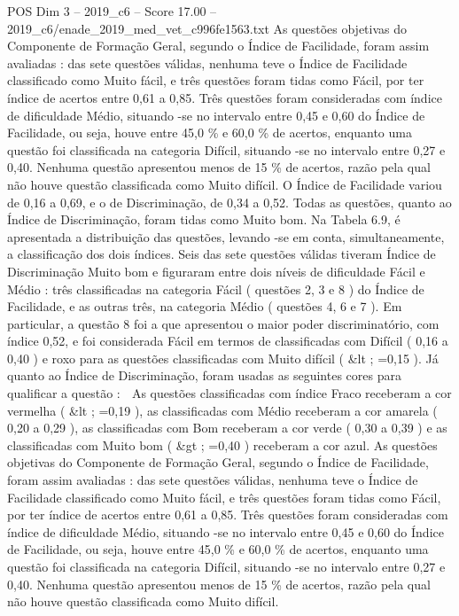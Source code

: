 \begin{textsample}{POS Dim 3 – 2019\_c6 – Score 17.00 – 2019\_c6/enade\_2019\_med\_vet\_c996fe1563.txt}
As questões objetivas do Componente de Formação Geral, segundo o Índice de Facilidade, foram assim avaliadas : das sete questões válidas, nenhuma teve o Índice de Facilidade classificado como Muito fácil, e três questões foram tidas como Fácil, por ter índice de acertos entre 0,61 a 0,85.
Três questões foram consideradas com índice de dificuldade Médio, situando -se no intervalo entre 0,45 e 0,60 do Índice de Facilidade, ou seja, houve entre 45,0 \% e 60,0 \% de acertos, enquanto uma questão foi classificada na categoria Difícil, situando -se no intervalo entre 0,27 e 0,40.
Nenhuma questão apresentou menos de 15 \% de acertos, razão pela qual não houve questão classificada como Muito difícil.
O Índice de Facilidade variou de 0,16 a 0,69, e o de Discriminação, de 0,34 a 0,52.
Todas as questões, quanto ao Índice de Discriminação, foram tidas como Muito bom.
Na Tabela 6.9, é apresentada a distribuição das questões, levando -se em conta, simultaneamente, a classificação dos dois índices.
Seis das sete questões válidas tiveram Índice de Discriminação Muito bom e figuraram entre dois níveis de dificuldade Fácil e Médio : três classificadas na categoria Fácil ( questões 2, 3 e 8 ) do Índice de Facilidade, e as outras três, na categoria Médio ( questões 4, 6 e 7 ).
Em particular, a questão 8 foi a que apresentou o maior poder discriminatório, com índice 0,52, e foi considerada Fácil em termos de classificadas com Difícil ( 0,16 a 0,40 ) e roxo para as questões classificadas com Muito difícil ( \&lt ; =0,15 ).
Já quanto ao Índice de Discriminação, foram usadas as seguintes cores para qualificar a questão :  As questões classificadas com índice Fraco receberam a cor vermelha ( \&lt ; =0,19 ), as classificadas com Médio receberam a cor amarela ( 0,20 a 0,29 ), as classificadas com Bom receberam a cor verde ( 0,30 a 0,39 ) e as classificadas com Muito bom ( \&gt ; =0,40 ) receberam a cor azul.
As questões objetivas do Componente de Formação Geral, segundo o Índice de Facilidade, foram assim avaliadas : das sete questões válidas, nenhuma teve o Índice de Facilidade classificado como Muito fácil, e três questões foram tidas como Fácil, por ter índice de acertos entre 0,61 a 0,85.
Três questões foram consideradas com índice de dificuldade Médio, situando -se no intervalo entre 0,45 e 0,60 do Índice de Facilidade, ou seja, houve entre 45,0 \% e 60,0 \% de acertos, enquanto uma questão foi classificada na categoria Difícil, situando -se no intervalo entre 0,27 e 0,40.
Nenhuma questão apresentou menos de 15 \% de acertos, razão pela qual não houve questão classificada como Muito difícil.

\end{textsample}
